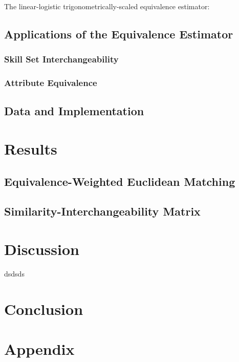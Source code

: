 \documentclass{article}
\begin{document}
The linear-logistic trigonometrically-scaled equivalence estimator:
\EquivalenceEstimator

\subsection{Applications of the Equivalence Estimator}
\subsubsection{Skill Set Interchangeability}
\InterchangeabilityFunction
\InterchangeabilityMatrix
\SignalFunction

\subsubsection{Attribute Equivalence}
\AttributeEquivalence

\subsection{Data and Implementation}

\section{Results}
\subsection{Equivalence-Weighted Euclidean Matching}

\subsection{Similarity-Interchangeability Matrix}


\section{Discussion}
dsdsds \parencite[]{dsdsds}


\section{Conclusion} 


\newpage
\printbibliography[
    heading=bibintoc,
    title={References}
]


\newpage
\section*{Appendix}



\end{document}
